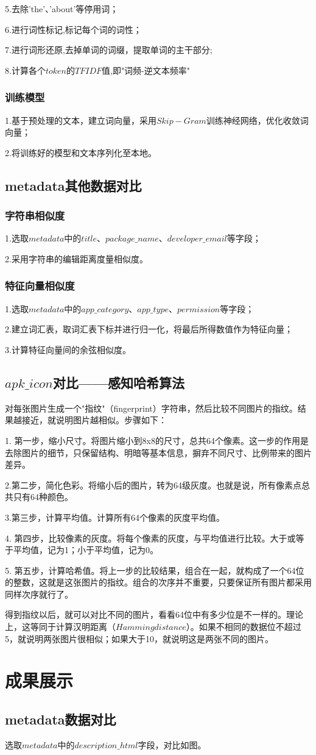 \documentclass[UTF8,a4paper,10pt, twocolumn]{ctexart}
\begin{document}
5.去除'the'、'about'等停用词；

6.进行词性标记,标记每个词的词性；

7.进行词形还原,去掉单词的词缀，提取单词的主干部分;

8.计算各个$token$的$TFIDF$值,即"词频-逆文本频率"

\subsubsection{训练模型}
1.基于预处理的文本，建立词向量，采用$Skip-Gram$训练神经网络，优化收敛词向量；

2.将训练好的模型和文本序列化至本地。

\subsection{metadata其他数据对比}
\subsubsection{字符串相似度}
1.选取$metadata$中的$title$、$package\_name$、$developer\_email$等字段；

2.采用字符串的编辑距离度量相似度。

\subsubsection{特征向量相似度}
1.选取$metadata$中的$app\_category$、$app\_type$、$permission$等字段；

2.建立词汇表，取词汇表下标并进行归一化，将最后所得数值作为特征向量；

3.计算特征向量间的余弦相似度。

\subsection{$apk\_icon$对比——感知哈希算法}
对每张图片生成一个"指纹"（fingerprint）字符串，然后比较不同图片的指纹。结果越接近，就说明图片越相似。步骤如下：

1. 第一步，缩小尺寸。将图片缩小到8x8的尺寸，总共64个像素。这一步的作用是去除图片的细节，只保留结构、明暗等基本信息，摒弃不同尺寸、比例带来的图片差异。

2.第二步，简化色彩。将缩小后的图片，转为64级灰度。也就是说，所有像素点总共只有64种颜色。

3.第三步，计算平均值。计算所有64个像素的灰度平均值。

4. 第四步，比较像素的灰度。将每个像素的灰度，与平均值进行比较。大于或等于平均值，记为1；小于平均值，记为0。

5. 第五步，计算哈希值。将上一步的比较结果，组合在一起，就构成了一个64位的整数，这就是这张图片的指纹。组合的次序并不重要，只要保证所有图片都采用同样次序就行了。

得到指纹以后，就可以对比不同的图片，看看64位中有多少位是不一样的。理论上，这等同于计算汉明距离（$Hamming distance$）。如果不相同的数据位不超过5，就说明两张图片很相似；如果大于10，就说明这是两张不同的图片。

\section{成果展示}
\subsection{metadata数据对比}
选取$metadata$中的$description\_html$字段，对比如图。
\end{document}
